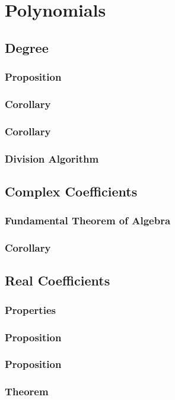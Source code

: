 \chapter{Polynomials}
\section{Degree}

\subsection{Proposition}
\subsection{Corollary}
\subsection{Corollary}
\subsection{Division Algorithm}
\section{Complex Coefficients}
\subsection{Fundamental Theorem of Algebra}
\subsection{Corollary}
\section{Real Coefficients}
\subsection{Properties}
\subsection{Proposition}
\subsection{Proposition}
\subsection{Theorem}